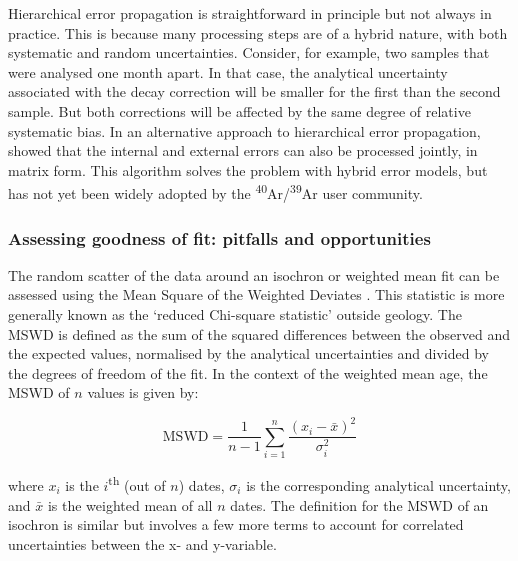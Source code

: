 \documentclass{article}
\begin{document}
Hierarchical error propagation is straightforward in principle but not
always in practice. This is because many processing steps are of a
hybrid nature, with both systematic and random uncertainties.
Consider, for example, two samples that were analysed one month
apart. In that case, the analytical uncertainty associated with the
decay correction will be smaller for the first than the second
sample. But both corrections will be affected by the same degree of
relative systematic bias.  In an alternative approach to hierarchical
error propagation, \citet{vermeesch2015b} showed that the internal and
external errors can also be processed jointly, in matrix form. This
algorithm solves the problem with hybrid error models, but has not yet
been widely adopted by the
\textsuperscript{40}Ar/\textsuperscript{39}Ar user community.

\subsubsection{Assessing goodness of fit: pitfalls and opportunities}
\label{sec:MSWD}

The random scatter of the data around an isochron or weighted mean fit
can be assessed using the Mean Square of the Weighted Deviates
\citep[MSWD,][]{mcintyre1966}. This statistic is more generally known
as the `reduced Chi-square statistic' outside geology. The MSWD is
defined as the sum of the squared differences between the observed and
the expected values, normalised by the analytical uncertainties and
divided by the degrees of freedom of the fit.  In the context of the
weighted mean age, the MSWD of $n$ values is given by:

\begin{equation}
  \mathrm{MSWD} = \frac{1}{n-1} \sum\limits_{i=1}^{n} \frac{\left(x_i
    - \bar{x}\right)^2}{\sigma_i^2}
  \label{eq:MSWD}
\end{equation}

\noindent where $x_i$ is the $i$\textsuperscript{th} (out of $n$)
dates, $\sigma_i$ is the corresponding analytical uncertainty, and
$\bar{x}$ is the weighted mean of all $n$ dates. The definition for
the MSWD of an isochron is similar but involves a few more terms to
account for correlated uncertainties between the x- and y-variable.
\end{document}
